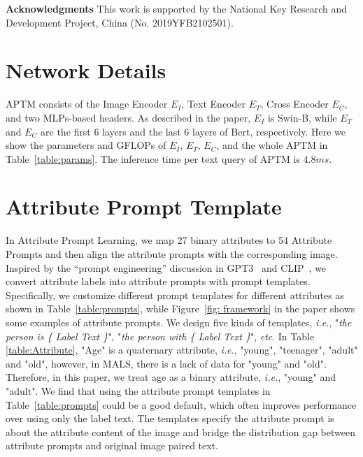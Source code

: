 \documentclass[sigconf]{acmart}
\def\ie{\emph{i.e.}}
\begin{document}
\noindent\textbf{Acknowledgments}
This work is supported by the National Key Research and Development Project, China (No. 2019YFB2102501).


  \newcommand{\gain}[1]{\textcolor{gain}{#1}}
  \newcommand{\lost}[1]{\textcolor{lost}{#1}}
\newcommand{\res}[2]{{#1} {({\gain{#2}})}}

{\small


}


\clearpage
\appendix
{}


\section{Network Details}
APTM consists of the Image Encoder $E_I$, Text Encoder $E_T$, Cross Encoder $E_C$, and two MLPs-based headers. As described in the paper, $E_I$ is Swin-B, while $E_T$ and $E_C$ are the first $6$ layers and the last $6$ layers of Bert, respectively. Here we show the parameters and GFLOPs of $E_I$, $E_T$, $E_C$, and the whole APTM in Table~\ref{table:params}. 
The inference time per text query of APTM is $4.8ms$.


\section{Attribute Prompt Template}
In Attribute Prompt Learning, we map 27 binary attributes to 54 Attribute Prompts and then align the attribute prompts with the corresponding image. 
Inspired by the “prompt engineering” discussion in GPT3~\cite{brown2020GPT3, gao2020making} and CLIP~\cite{radford2021CLIP}, we convert attribute labels into attribute prompts with prompt templates.
Specifically, we customize different prompt templates for different attributes as shown in Table~\ref{table:prompts}, while Figure~\ref{fig: framework} in the paper shows some examples of attribute prompts. 
We design five kinds of templates, \ie, "\textit{the person is \{ Label Text \}}", "\textit{the person with \{ Label Text \}}", \emph{etc}.
In Table \ref{table:Attribute}, "Age" is a quaternary attribute, \ie, "young", "teenager", "adult" and "old", however, in MALS, there is a lack of data for "young" and "old". Therefore, in this paper, we treat age as a binary attribute, \ie, "young" and "adult".
We find that using the attribute prompt templates in Table~\ref{table:prompts} could be a good default, which often improves performance over using only the label text. 
The templates specify the attribute prompt is about the attribute content of the image and bridge the distribution gap between attribute prompts and original image paired text.
\end{document}
